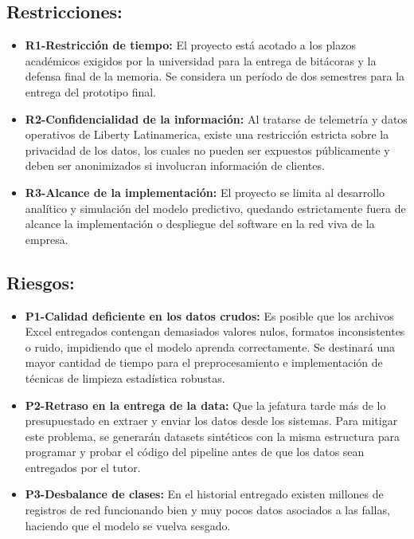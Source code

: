 \documentclass[12pt,a4paper]{article}
\begin{document}
        \subsection{\textbf{Restricciones:}} 
                    \begin{itemize}
                        \item \textbf{R1-Restricción de tiempo:} El proyecto está acotado a los plazos académicos exigidos por la universidad para la entrega de bitácoras y la defensa final de la memoria. Se considera un período de dos semestres para la entrega del prototipo final.
                        \item \textbf{R2-Confidencialidad de la información:} Al tratarse de telemetría y datos operativos de Liberty Latinamerica, existe una restricción estricta sobre la privacidad de los datos, los cuales no pueden ser expuestos públicamente y deben ser anonimizados si involucran información de clientes.
                        \item \textbf{R3-Alcance de la implementación:} El proyecto se limita al desarrollo analítico y simulación del modelo predictivo, quedando estrictamente fuera de alcance la implementación o despliegue del software en la red viva de la empresa.
                    \end{itemize}
        \subsection{\textbf{Riesgos:}}
                    \begin{itemize}
                        \item \textbf{P1-Calidad deficiente en los datos crudos:} Es posible que los archivos Excel entregados contengan demasiados valores nulos, formatos inconsistentes o ruido, impidiendo que el modelo aprenda correctamente. Se destinará una mayor cantidad de tiempo para el preprocesamiento e implementación de técnicas de limpieza estadística robustas.
                        \item \textbf{P2-Retraso en la entrega de la data:} Que la jefatura tarde más de lo presupuestado en extraer y enviar los datos desde los sistemas. Para mitigar este problema, se generarán datasets sintéticos con la misma estructura para programar y probar el código del pipeline antes de que los datos sean entregados por el tutor.
                        \item \textbf{P3-Desbalance de clases:} En el historial entregado existen millones de registros de red funcionando bien y muy pocos datos asociados a las fallas, haciendo que el modelo se vuelva sesgado.
                    \end{itemize}
\end{document}
